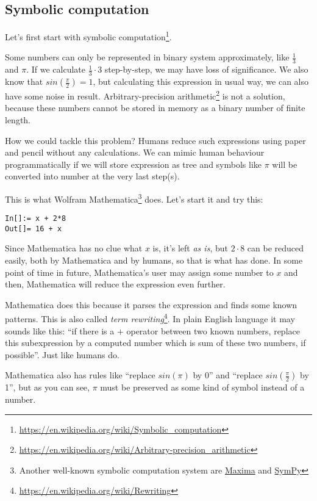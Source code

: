 \subsection{Symbolic computation}

Let's first start with symbolic computation\footnote{\url{https://en.wikipedia.org/wiki/Symbolic_computation}}.

Some numbers can only be represented in binary system approximately, like $\frac{1}{3}$ and $\pi$.
If we calculate $\frac{1}{3} \cdot 3$ step-by-step, we may have loss of significance.
We also know that $sin(\frac{\pi}{2}) = 1$, but calculating this expression in usual way,
we can also have some noise in result.
Arbitrary-precision arithmetic\footnote{\url{https://en.wikipedia.org/wiki/Arbitrary-precision_arithmetic}} is not a solution,
because these numbers cannot be stored in memory as a binary number of finite length.

How we could tackle this problem?
Humans reduce such expressions using paper and pencil without any calculations.
We can mimic human behaviour programmatically if we will store expression as tree and symbols like $\pi$ will be converted into number at the very last step(s).

This is what Wolfram Mathematica\footnote{Another well-known symbolic computation system are 
\href{https://en.wikipedia.org/wiki/Maxima_\%28software\%29}{Maxima} and 
\href{https://en.wikipedia.org/wiki/SymPy}{SymPy}} does.
Let's start it and try this:

\begin{lstlisting}
In[]:= x + 2*8
Out[]= 16 + x
\end{lstlisting}

Since Mathematica has no clue what $x$ is, it's left \textit{as is}, but $2 \cdot 8$ can be reduced easily, both by Mathematica and by humans,
so that is what has done.
In some point of time in future, Mathematica's user may assign some number to $x$ and then, Mathematica will reduce the expression even further.

Mathematica does this because it parses the expression and finds some known patterns.
This is also called \textit{term rewriting}\footnote{\url{https://en.wikipedia.org/wiki/Rewriting}}.
In plain English language it may sounds like this:
``if there is a $+$ operator between two known numbers, replace this subexpression by a computed number which is sum of these two numbers, if possible''.
Just like humans do.

Mathematica also has rules like ``replace $sin(\pi)$ by 0'' and ``replace $sin(\frac{\pi}{2})$ by 1'', but as you can see, $\pi$ must be preserved
as some kind of symbol instead of a number.

